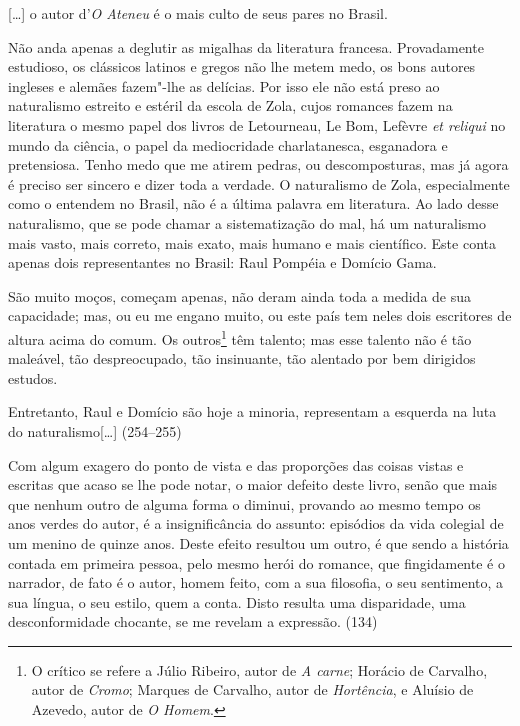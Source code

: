 
[\ldots] o autor d'\textit{O Ateneu} é o mais culto de seus pares no Brasil.

Não anda apenas a deglutir as migalhas da literatura
francesa. Provadamente estudioso, os clássicos latinos e gregos não lhe
metem medo, os bons autores ingleses e alemães fazem"-lhe as delícias.
Por isso ele não está preso ao naturalismo estreito e estéril da escola
de Zola, cujos romances fazem na literatura o mesmo papel dos livros de
Letourneau, Le Bom, Lefèvre \textit{et reliqui} no mundo da ciência, o papel da mediocridade
charlatanesca, esganadora e pretensiosa. Tenho medo que me atirem
pedras, ou descomposturas, mas já agora é preciso ser sincero e dizer
toda a verdade. O naturalismo de Zola, especialmente como o entendem no
Brasil, não é a última palavra em literatura. Ao lado desse
naturalismo, que se pode chamar a sistematização do mal, há um
naturalismo mais vasto, mais correto, mais exato, mais humano e mais
científico. Este conta apenas dois representantes no Brasil: Raul
Pompéia e Domício Gama.

São muito moços, começam apenas, não deram ainda toda a
medida de sua capacidade; mas, ou eu me engano muito, ou este país tem
neles dois escritores de altura acima do comum. Os outros\footnote{O
crítico se refere a Júlio Ribeiro, autor de \textit{A carne}; Horácio
de Carvalho, autor de \textit{Cromo}; Marques de Carvalho, autor de
\textit{Hortência}, e Aluísio de Azevedo, autor de \textit{O Homem}.} 
têm talento; mas esse talento não é tão maleável, tão
despreocupado, tão insinuante, tão alentado por bem dirigidos estudos.

Entretanto, Raul e Domício são hoje a minoria, representam a esquerda na
luta do naturalismo[\ldots] (254--255)



Com algum exagero do ponto de vista e das proporções das coisas vistas e
escritas que acaso se lhe pode notar, o maior defeito deste livro,
senão que mais que nenhum outro de alguma forma o diminui, provando ao
mesmo tempo os anos verdes do autor, é a insignificância do assunto:
episódios da vida colegial de um menino de quinze anos. Deste efeito
resultou um outro, é que sendo a história contada em primeira pessoa,
pelo mesmo herói do romance, que fingidamente é o narrador, de fato é o
autor, homem feito, com a sua filosofia, o seu sentimento, a sua
língua, o seu estilo, quem a conta. Disto resulta uma disparidade, uma
desconformidade chocante, se me revelam a expressão. (134)

